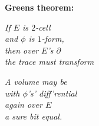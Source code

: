 \documentclass[letter]{article}
\newenvironment{menumerate}{%
  \edef\backupindent{\the\parindent}%
  \enumerate%
  \setlength{\parindent}{\backupindent}%
}{\endenumerate}
\begin{document}
\begin{menumerate}
	\setcounter{enumi}{132}
	\item 

	\setcounter{enumi}{151}
	\item \textbf{Greens theorem:}

	\emph{If $E$ is $2$-cell \\
		and $\phi$ is $1$-form, \\ 
		then over $E$'s $\partial$ \\
		the trace must transform }

		\emph{		A volume may be \\
		with $\phi$'s' diff'rential \\
		again over $E$ \\
		a sure bit equal.}
\end{menumerate}
\end{document}
